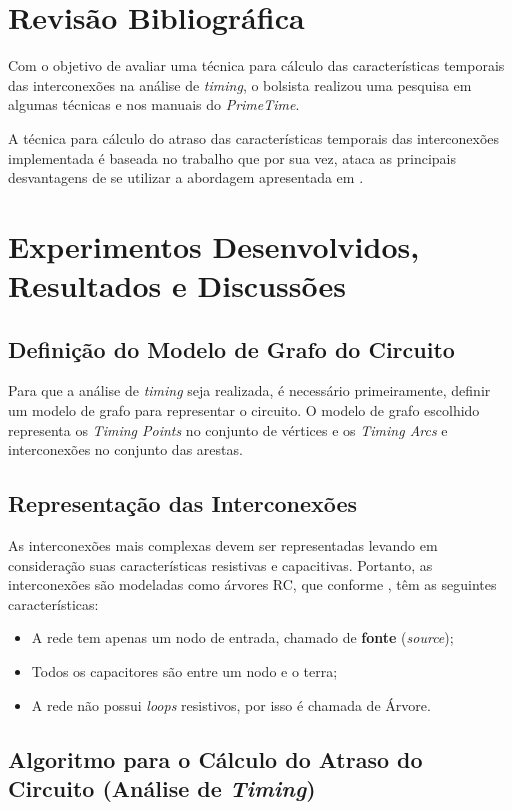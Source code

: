 \documentclass[
	12pt,				%
	openright,			%
	twoside,			%
	a4paper,			%
	english,			%
	french,				%
	spanish,			%
	brazil,				%
	]{abntex2}
\begin{document}
\section{Revisão Bibliográfica}

Com o objetivo de avaliar uma técnica para cálculo das características temporais das interconexões na análise de \textit{timing}, o bolsista realizou uma pesquisa em algumas técnicas e nos manuais do \textit{PrimeTime}. 

A técnica para cálculo do atraso das características temporais das interconexões implementada é baseada no trabalho \cite{PURI02} que por sua vez, ataca as principais desvantagens de se utilizar a abordagem apresentada em \cite{Kashyap00}.

\section{Experimentos Desenvolvidos, Resultados e Discussões}

\subsection{Definição do Modelo de Grafo do Circuito}
Para que a análise de \textit{timing} seja realizada, é necessário primeiramente, definir um modelo de grafo para representar o circuito. O modelo de grafo escolhido representa os \textit{Timing Points} no conjunto de vértices e os \textit{Timing Arcs} e interconexões no conjunto das arestas.

\subsection{Representação das Interconexões}
As interconexões mais complexas devem ser representadas levando em consideração suas características resistivas e capacitivas. Portanto, as interconexões são modeladas como árvores RC, que conforme , têm as seguintes características: 

\begin{itemize}
\item A rede tem apenas um nodo de entrada, chamado de \textbf{fonte} (\textit{source});
\item Todos os capacitores são entre um nodo e o terra;
\item A rede não possui \textit{loops} resistivos, por isso é chamada de Árvore.
\end{itemize}

\subsection{Algoritmo para o Cálculo do Atraso do Circuito (Análise de \textit{Timing})}
\end{document}
